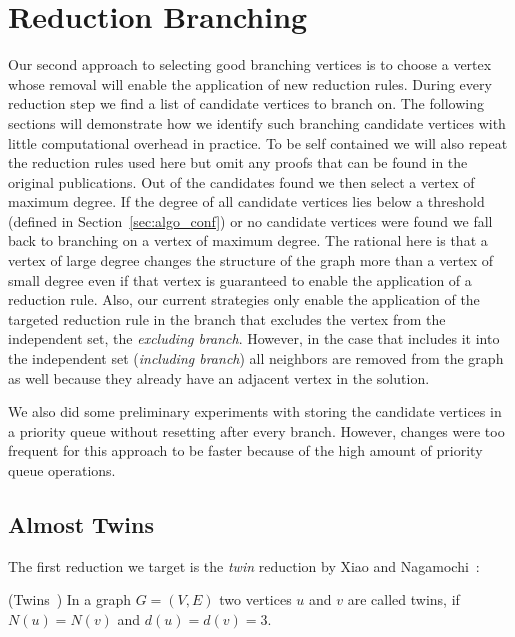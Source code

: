 \documentclass[a4paper,UKenglish,cleveref, autoref, thm-restate]{lipics-v2021}
\begin{document}
\section{Reduction Branching}\label{sec:reduction_branching}
Our second approach to selecting good branching vertices is to choose a vertex
whose removal will enable the application of new reduction rules. During every
reduction step we find a list of candidate vertices to branch on. The following
sections will demonstrate how we identify such branching candidate vertices with little
computational overhead in practice. To be self contained we will also repeat the reduction
rules used here but omit any proofs that can be found in the original
publications. Out of the candidates found we then select a vertex of
maximum degree. If the degree of all candidate vertices lies below a threshold
(defined in Section~\ref{sec:algo_conf}) or no candidate vertices were found we fall back to branching on a vertex
of maximum degree. The rational here is that a vertex of large degree changes
the structure of the graph more than a vertex of small degree even if that
vertex is guaranteed to enable the application of a reduction rule. Also, our
current strategies only enable the application of the targeted reduction rule in
the branch that excludes the vertex from the independent set, the
\emph{excluding branch}. However, in the
case that includes it into the independent set (\emph{including branch}) all neighbors are removed from
the graph as well because they already have an adjacent vertex in the solution.

We also did some preliminary experiments with storing the candidate vertices in
a priority queue without resetting after every branch.
However, changes were too frequent for this approach to be faster because of
the high amount of priority queue operations.

\subsection{Almost Twins}

The first reduction we target is the \emph{twin} reduction by Xiao and Nagamochi~\cite{XiaoUnconfined}:

\begin{definition}(Twins~\cite{XiaoUnconfined})
  In a graph $G=(V,E)$ two vertices $u$ and $v$ are called twins, if $N(u) = N(v)$ and $d(u) = d(v) = 3$.
\end{definition}
\end{document}
